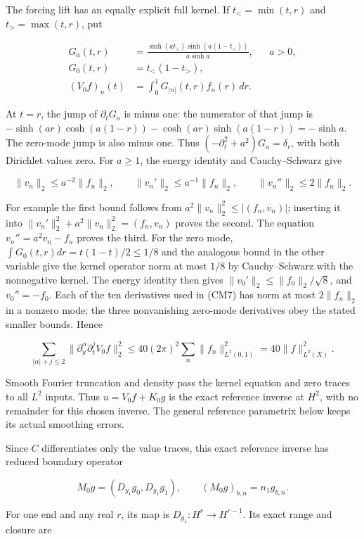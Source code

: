 \documentclass[
  11pt,
]{article}
\begin{document}
The forcing lift has an equally explicit full kernel. If
\(t_< =\min(t,r)\) and \(t_>=\max(t,r)\), put

\[
 \begin{aligned}
 G_a(t,r)&=\frac{\sinh(a t_<)\sinh(a(1-t_>))}{a\sinh a},&&a>0,\\
 G_0(t,r)&=t_<(1-t_>),\\
 (V_0f)_n(t)&=\int_0^1G_{|n|}(t,r)f_n(r)\,dr.
 \end{aligned}
 \tag{CM8}
\]

At \(t=r\), the jump of \(\partial_tG_a\) is minus one: the numerator of
that jump is
\(-\sinh(ar)\cosh(a(1-r))-\cosh(ar)\sinh(a(1-r))=-\sinh a\). The
zero-mode jump is also minus one. Thus
\((-\partial_t^2+a^2)G_a=\delta_r\), with both Dirichlet values zero.
For \(a\geq1\), the energy identity and Cauchy--Schwarz give

\[
 \|v_n\|_2\leq a^{-2}\|f_n\|_2,\qquad
 \|v_n'\|_2\leq a^{-1}\|f_n\|_2,\qquad
 \|v_n''\|_2\leq2\|f_n\|_2.
 \tag{CM9}
\]

For example the first bound follows from
\(a^2\|v_n\|_2^2\leq |(f_n,v_n)|\); inserting it into
\(\|v_n'\|_2^2+a^2\|v_n\|_2^2=(f_n,v_n)\) proves the second. The
equation \(v_n''=a^2v_n-f_n\) proves the third. For the zero mode,
\(\int G_0(t,r)dr=t(1-t)/2\leq1/8\) and the analogous bound in the other
variable give the kernel operator norm at most \(1/8\) by
Cauchy--Schwarz with the nonnegative kernel. The energy identity then
gives \(\|v_0'\|_2\leq\|f_0\|_2/\sqrt8\), and \(v_0''=-f_0\). Each of
the ten derivatives used in (CM7) has norm at most \(2\|f_n\|_2\) in a
nonzero mode; the three nonvanishing zero-mode derivatives obey the
stated smaller bounds. Hence

\[
 \sum_{|\alpha|+j\leq2}
       \|\partial_y^\alpha\partial_t^j V_0f\|_2^2
          \leq40(2\pi)^2\sum_n\|f_n\|_{L^2(0,1)}^2
          =40\|f\|_{L^2(X)}^2.
 \tag{CM10}
\]

Smooth Fourier truncation and density pass the kernel equation and zero
traces to all \(L^2\) inputs. Thus \(u=V_0f+K_0g\) is the exact
reference inverse at \(H^2\), with no remainder for this chosen inverse.
The general reference parametrix below keeps its actual smoothing
errors.

Since \(C\) differentiates only the value traces, this exact reference
inverse has reduced boundary operator

\[
 M_0g=(D_{y_1}g_0,D_{y_1}g_1),\qquad
 (M_0g)_{b,n}=n_1g_{b,n}.
 \tag{CM11}
\]

For one end and any real \(r\), its map is \(D_{y_1}:H^r\to H^{r-1}\).
Its exact range and closure are
\end{document}
